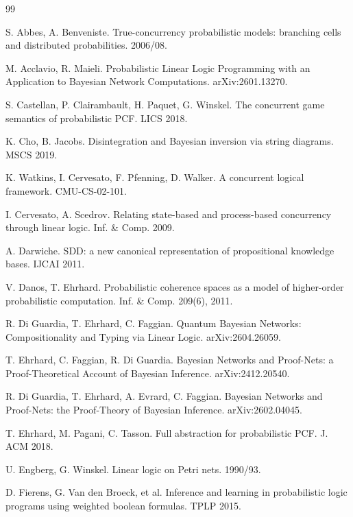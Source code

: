 \documentclass[11pt]{article}
\theoremstyle{plain}
\theoremstyle{definition}
\theoremstyle{remark}
\begin{document}
\begin{thebibliography}{99}\small

 S. Abbes, A. Benveniste. True-concurrency
probabilistic models: branching cells and distributed probabilities.
2006/08.

 M. Acclavio, R. Maieli. Probabilistic Linear
Logic Programming with an Application to Bayesian Network
Computations. arXiv:2601.13270.

 S. Castellan, P. Clairambault, H. Paquet, G.
Winskel. The concurrent game semantics of probabilistic PCF. LICS
2018.

 K. Cho, B. Jacobs. Disintegration and Bayesian
inversion via string diagrams. MSCS 2019.

 K. Watkins, I. Cervesato, F. Pfenning, D. Walker. A
concurrent logical framework. CMU-CS-02-101.

 I. Cervesato, A. Scedrov. Relating state-based
and process-based concurrency through linear logic. Inf. \& Comp.
2009.

 A. Darwiche. SDD: a new canonical
representation of propositional knowledge bases. IJCAI 2011.

 V. Danos, T. Ehrhard. Probabilistic coherence
spaces as a model of higher-order probabilistic computation. Inf. \&
Comp. 209(6), 2011.

 R. Di Guardia, T. Ehrhard, C. Faggian. Quantum
Bayesian Networks: Compositionality and Typing via Linear Logic.
arXiv:2604.26059.

 T. Ehrhard, C. Faggian, R. Di Guardia. Bayesian
Networks and Proof-Nets: a Proof-Theoretical Account of Bayesian
Inference. arXiv:2412.20540.

 R. Di Guardia, T. Ehrhard, A. Evrard, C.
Faggian. Bayesian Networks and Proof-Nets: the Proof-Theory of
Bayesian Inference. arXiv:2602.04045.

 T. Ehrhard, M. Pagani, C. Tasson. Full
abstraction for probabilistic PCF. J. ACM 2018.

 U. Engberg, G. Winskel. Linear logic on Petri
nets. 1990/93.

 D. Fierens, G. Van den Broeck, et al.
Inference and learning in probabilistic logic programs using weighted
boolean formulas. TPLP 2015.


\end{thebibliography}
\end{document}
